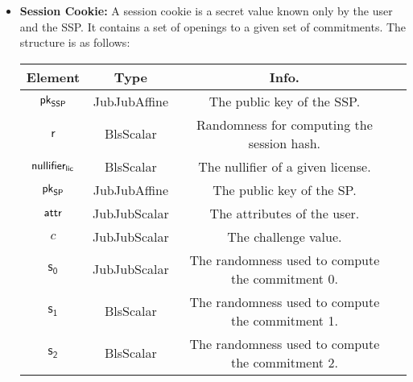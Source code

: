 \begin{itemize}
    \item \textbf{Session Cookie:} A session cookie is a secret value known only by the user and the SSP. It contains a set of openings to a given set of commitments. The structure is as follows:

    \begin{center}
        \begin{tabular}{ |c|c|c|c| } 
        \hline
        \textbf{Element} & \textbf{Type} & \textbf{Info.} \\
        \hline
        $\mathsf{pk}_{\mathsf{SSP}}$ & JubJubAffine & The public key of the SSP. \\
        $\mathsf{r}$ & BlsScalar & Randomness for computing the session hash. \\
        $\mathsf{nullifier_{lic}}$ & BlsScalar & The nullifier of a given license. \\ 
        $\mathsf{pk}_{\mathsf{SP}}$ & JubJubAffine & The public key of the SP. \\ 
        $\mathsf{attr}$ & JubJubScalar & The attributes of the user. \\ 
        $c$ & JubJubScalar & The challenge value. \\ 
        $\mathsf{s_0}$ & JubJubScalar & The randomness used to compute the commitment 0. \\
        $\mathsf{s_1}$ & BlsScalar & The randomness used to compute the commitment 1. \\
        $\mathsf{s_2}$ & BlsScalar & The randomness used to compute the commitment 2. \\
        \hline
        \end{tabular}
    \end{center}

\end{itemize}